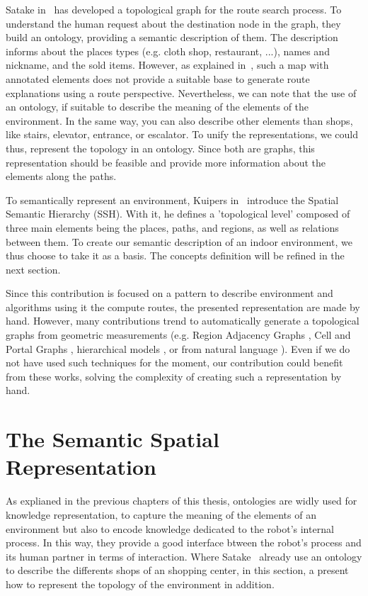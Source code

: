 Satake in~\cite{satake_2015_field} has developed a topological graph for the route search process. To understand the human request about the destination node in the graph, they build an ontology, providing a semantic description of them. The description informs about the places types (e.g. cloth shop, restaurant, ...), names and nickname, and the sold items. However, as explained in~\cite{morales_2015_building}, such a map with annotated elements does not provide a suitable base to generate route explanations using a route perspective. Nevertheless, we can note that the use of an ontology, if suitable to describe the meaning of the elements of the environment. In the same way, you can also describe other elements than shops, like stairs, elevator, entrance, or escalator. To unify the representations, we could thus, represent the topology in an ontology. Since both are graphs, this representation should be feasible and provide more information about the elements along the paths.

To semantically represent an environment, Kuipers in~\cite{kuipers_2000_spatial} introduce the Spatial Semantic Hierarchy (SSH). With it, he defines a 'topological level' composed of three main elements being the places, paths, and regions, as well as relations between them. To create our semantic description of an indoor environment, we thus choose to take it as a basis. The concepts definition will be refined in the next section.

Since this contribution is focused on a pattern to describe environment and algorithms using it the compute routes, the presented representation are made by hand. However, many contributions trend to automatically generate a topological graphs from geometric measurements (e.g. Region Adjacency Graphs \cite{kuipers_2004_local}, Cell and Portal Graphs \cite{lefebvre_2003_automatic}, hierarchical models \cite{lorenz_2006_hybrid}, or from natural language \cite{hemachandra_2014_learning}). Even if we do not have used such techniques for the moment, our contribution could benefit from these works, solving the complexity of creating such a representation by hand.

\section{The Semantic Spatial Representation}

As explianed in the previous chapters of this thesis, ontologies are widly used for knowledge representation, to capture the meaning of the elements of an environment but also to encode knowledge dedicated to the robot's internal process. In this way, they provide a good interface btween the robot's process and its human partner in terms of interaction. Where Satake~\cite{satake_2015_field} already use an ontology to describe the differents shops of an shopping center, in this section, a present how to represent the topology of the environment in addition.

